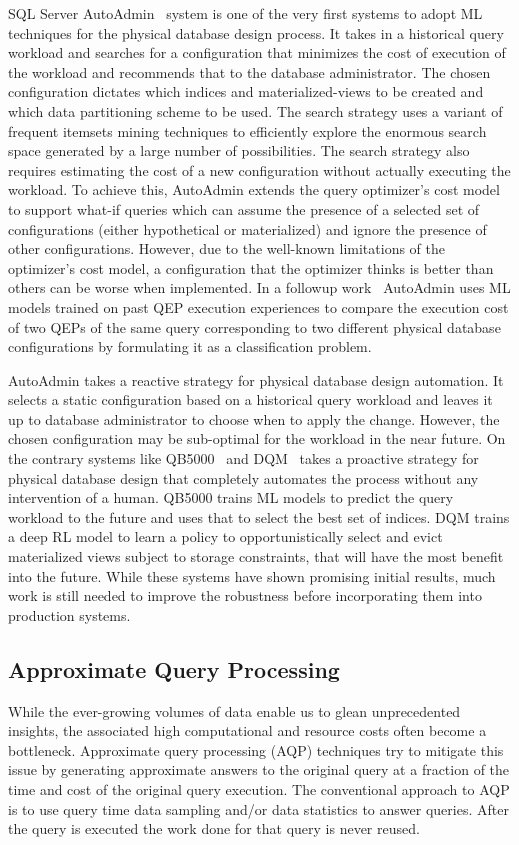 SQL Server AutoAdmin~\cite{autoadmin} system is one of the very first systems to adopt ML techniques for the physical database design process.
It takes in a historical query workload and searches for a configuration that minimizes the cost of execution of the workload and recommends that to the database administrator.
The chosen configuration dictates which indices and materialized-views to be created and which data partitioning scheme to be used.
The search strategy uses a variant of frequent itemsets mining techniques to efficiently explore the enormous search space generated by a large number of possibilities.
The search strategy also requires estimating the cost of a new configuration without actually executing the workload.
To achieve this, AutoAdmin extends the query optimizer's cost model to support what-if queries which can assume the presence of a selected set of configurations (either hypothetical or materialized) and ignore the presence of other configurations.
However, due to the well-known limitations of the optimizer's cost model, a configuration that the optimizer thinks is better than others can be worse when implemented.
In a followup work~\cite{autoadmin_2,} AutoAdmin uses ML models trained on past QEP execution experiences to compare the execution cost of two QEPs of the same query corresponding to two different physical database configurations by formulating it as a classification problem.

AutoAdmin takes a reactive strategy for physical database design automation. 
It selects a static configuration based on a historical query workload and leaves it up to database administrator to choose when to apply the change.
However, the chosen configuration may be sub-optimal for the workload in the near future.
On the contrary systems like QB5000~\cite{qb5000} and DQM~\cite{dqm} takes a proactive strategy for physical database design that completely automates the process without any intervention of a human.
QB5000 trains ML models to predict the query workload to the future and uses that to select the best set of indices.
DQM trains a deep RL model to learn a policy to opportunistically select and evict materialized views subject to storage constraints, that will have the most benefit into the future.
While these systems have shown promising initial results, much work is still needed to improve the robustness before incorporating them into production systems.

\subsection{Approximate Query Processing}
While the ever-growing volumes of data enable us to glean unprecedented insights, the associated high computational and resource costs often become a bottleneck.
Approximate query processing (AQP) techniques try to mitigate this issue by generating approximate answers to the original query at a fraction of the time and cost of the original query execution.
The conventional approach to AQP is to use query time data sampling and/or data statistics to answer queries.
After the query is executed the work done for that query is never reused.



